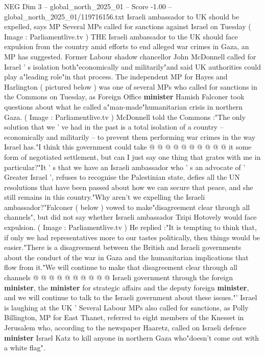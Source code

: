 \begin{textsample}{NEG Dim 3 – global\_north\_2025\_01 – Score -1.00 – global\_north\_2025\_01/119716156.txt}  \label{ex:f3_neg_198}
Israeli ambassador to UK should be expelled, says MP Several MPs called for sanctions against Israel on Tuesday ( Image : Parliamentlive.tv ) THE Israeli ambassador to the UK should face expulsion from the country amid efforts to end alleged war crimes in Gaza, an MP has suggested.
Former Labour shadow chancellor John McDonnell called for Israel ' s isolation both"economically and militarily"and said UK authorities could play a"leading role"in that process.
The independent MP for Hayes and Harlington ( pictured below ) was one of several MPs who called for sanctions in the Commons on Tuesday, as Foreign Office \textbf{minister} Hamish Falconer took questions about what he called a"man-made"humanitarian crisis in northern Gaza. ( Image : Parliamentlive.tv ) McDonnell told the Commons :"The only solution that we ' ve had in the past is a total isolation of a country -- economically and militarily -- to prevent them performing war crimes in the way Israel has."I think this government could take @ @ @ @ @ @ @ @ @ @ it some form of negotiated settlement, but can I just say one thing that grates with me in particular?"It ' s that we have an Israeli ambassador who ' s an advocate of ' Greater Israel ', refuses to recognise the Palestinian state, defies all the UN resolutions that have been passed about how we can secure that peace, and she still remains in this country."Why aren't we expelling the Israeli ambassador?"Falconer ( below ) vowed to make"disagreement clear through all channels", but did not say whether Israeli ambassador Tzipi Hotovely would face expulsion. ( Image : Parliamentlive.tv ) He replied :"It is tempting to think that, if only we had representatives more to our tastes politically, then things would be easier."There is a disagreement between the British and Israeli governments about the conduct of the war in Gaza and the humanitarian implications that flow from it."We will continue to make that disagreement clear through all channels @ @ @ @ @ @ @ @ @ @ Israeli government through the foreign \textbf{minister}, the \textbf{minister} for strategic affairs and the deputy foreign \textbf{minister}, and we will continue to talk to the Israeli government about these issues."' Israel is laughing at the UK ' Several Labour MPs also called for sanctions, as Polly Billington, MP for East Thanet, referred to eight members of the Knesset in Jerusalem who, according to the newspaper Haaretz, called on Israeli defence \textbf{minister} Israel Katz to kill anyone in northern Gaza who"doesn't come out with a white flag".

\end{textsample}
